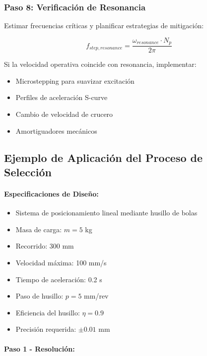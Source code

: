 \subsubsection{Paso 8: Verificación de Resonancia}

Estimar frecuencias críticas y planificar estrategias de mitigación:

\begin{equation}
f_{step,resonance} = \frac{\omega_{resonance} \cdot N_p}{2\pi}
\end{equation}

Si la velocidad operativa coincide con resonancia, implementar:
\begin{itemize}
    \item Microstepping para suavizar excitación
    \item Perfiles de aceleración S-curve
    \item Cambio de velocidad de crucero
    \item Amortiguadores mecánicos
\end{itemize}

\subsection{Ejemplo de Aplicación del Proceso de Selección}

\paragraph{Especificaciones de Diseño:}

\begin{itemize}
    \item Sistema de posicionamiento lineal mediante husillo de bolas
    \item Masa de carga: $m = 5$ kg
    \item Recorrido: 300 mm
    \item Velocidad máxima: 100 mm/s
    \item Tiempo de aceleración: 0.2 s
    \item Paso de husillo: $p = 5$ mm/rev
    \item Eficiencia del husillo: $\eta = 0.9$
    \item Precisión requerida: $\pm 0.01$ mm
\end{itemize}

\paragraph{Paso 1 - Resolución:}

